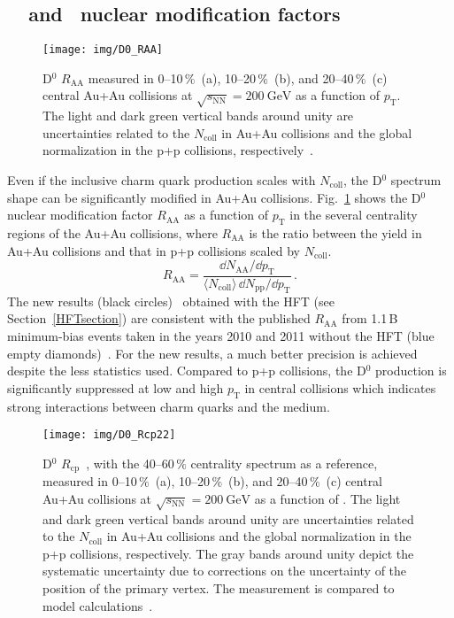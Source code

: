 \subsection{\dzero\ \Raa\ and \Rcp\ nuclear modification factors}
\begin{figure}[!htb]
\begin{center}
 \texttt{[image: img/D0\_RAA]}\\
\end{center}
\caption{\label{dzeroRAA}D$^0$ $R_\mathrm{AA}$ measured in 0--10$\,\%$~(a), 10--20$\,\%$~(b), and 20--40$\,\%$~(c) central Au+Au collisions at $\sqrt{s_\mathrm{NN}} = \SI{200}{\giga\electronvolt}$ as a function of $p_\mathrm{T}$\@. The
light and dark green vertical bands around unity are uncertainties related
to the $N_\mathrm{coll}$ in Au+Au collisions and the global normalization in the p+p collisions,
respectively~\cite{D0paper, publishedDzero}.}
\end{figure}
Even if the inclusive charm quark production scales with $N_\mathrm{coll}$,
the D$^0$ spectrum shape can be significantly modified in Au+Au collisions. Fig.~\ref{dzeroRAA}
shows the D$^0$ nuclear modification factor
$R_\mathrm{AA}$
as a function of $p_\mathrm{T}$ in the several centrality regions of the Au+Au collisions, where $R_\mathrm{AA}$ is the ratio between the yield in Au+Au collisions
and that in p+p collisions scaled by $N_\mathrm{coll}$\@.
\begin{equation}
R_\mathrm{AA} = \frac{\dd N_\mathrm{AA}/\dd p_\mathrm{T}}
{\langle N_\mathrm{coll} \rangle\, \dd N_\mathrm{pp}/\dd p_\mathrm{T}}\,.
\end{equation}
The new results
(black circles)~\cite{D0paper} obtained with the HFT (see Section~\ref{HFTsection}) are consistent with the published
$R_\mathrm{AA}$ from 1.1$\,$B minimum-bias events taken in the years 2010 and 2011 
without the HFT (blue empty diamonds)~\cite{publishedDzero}\@.
For the new results, a much better precision is achieved despite the less statistics used. 
Compared to p+p collisions, the D$^0$ production is significantly suppressed at low and high $p_\mathrm{T}$ in central collisions which indicates
strong interactions between charm quarks and the medium.

\begin{figure}[!htb]
\begin{center}
 \texttt{[image: img/D0\_Rcp22]}\\
\end{center}
\caption{\label{dzeroRcp}D$^0$ $R_\mathrm{cp}$~\cite{D0paper}, with the 40--60$\,\%$ centrality spectrum as a reference, measured in 0--10$\,\%$~(a), 10--20$\,\%$~(b), and 20--40$\,\%$~(c) central Au+Au collisions at $\sqrt{s_\mathrm{NN}} = \SI{200}{\giga\electronvolt}$ as a function of \pt\@. The
light and dark green vertical bands around unity are uncertainties related
to the $N_\mathrm{coll}$ in Au+Au collisions and the global normalization in the p+p collisions,
respectively. The gray bands around unity depict the systematic uncertainty due to corrections on the uncertainty of the position of the primary vertex. The measurement is compared to model calculations~\cite{Duke, Duke2015, LBT, LBTprivate}.}
\end{figure}


